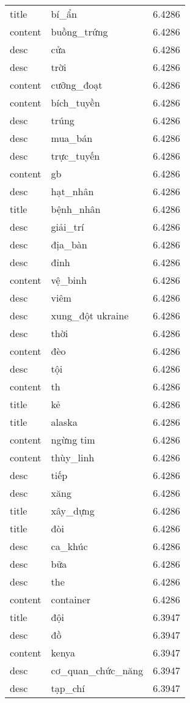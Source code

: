 \documentclass{article}
\begin{document}
\begin{tabular}{lll}
title & bí\_ẩn & 6.4286\\
content & buồng\_trứng & 6.4286\\
desc & cửa & 6.4286\\
desc & trời & 6.4286\\
content & cưỡng\_đoạt & 6.4286\\
content & bích\_tuyền & 6.4286\\
desc & trúng & 6.4286\\
desc & mua\_bán & 6.4286\\
desc & trực\_tuyến & 6.4286\\
content & gb & 6.4286\\
desc & hạt\_nhân & 6.4286\\
title & bệnh\_nhân & 6.4286\\
desc & giải\_trí & 6.4286\\
desc & địa\_bàn & 6.4286\\
desc & đỉnh & 6.4286\\
content & vệ\_binh & 6.4286\\
desc & viêm & 6.4286\\
desc & xung\_đột ukraine & 6.4286\\
desc & thời & 6.4286\\
content & đèo & 6.4286\\
desc & tội & 6.4286\\
content & th & 6.4286\\
title & kẻ & 6.4286\\
title & alaska & 6.4286\\
content & ngừng tim & 6.4286\\
content & thùy\_linh & 6.4286\\
desc & tiếp & 6.4286\\
desc & xăng & 6.4286\\
title & xây\_dựng & 6.4286\\
title & đòi & 6.4286\\
desc & ca\_khúc & 6.4286\\
desc & bữa & 6.4286\\
desc & the & 6.4286\\
content & container & 6.4286\\
title & đội & 6.3947\\
desc & đồ & 6.3947\\
content & kenya & 6.3947\\
desc & cơ\_quan\_chức\_năng & 6.3947\\
desc & tạp\_chí & 6.3947\\

\end{tabular}
\end{document}

